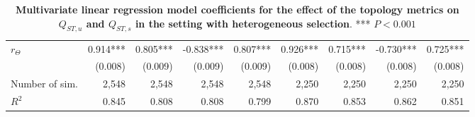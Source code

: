 \begin{table}[ht]
{\begin{tabular}{|l|r|r|r|r|r|r|r|r|}
    $r_\Theta$     &                  0.914*** &                 0.805*** &                -0.838*** &                 0.807***   &  0.926*** &                 0.715*** &                -0.730*** &                 0.725***\\ 
                   &                   (0.008) &                  (0.009) &                  (0.009) &                  (0.009)   &   (0.008) &                  (0.008) &                  (0.008) &                  (0.008)\\ 
    \hline
    Number of sim. &                     2,548 &                    2,548 &                    2,548 &                    2,548   &     2,250 &                    2,250 &                    2,250 &                    2,250\\ 
    $R^2$          &                     0.845 &                    0.808 &                    0.808 &                    0.799   &     0.870 &                    0.853 &                    0.862 &                    0.851\\ 
    \hline 
    \end{tabular}
    }
    \caption{ \textbf{Multivariate linear regression model coefficients for the effect of the topology metrics on $Q_{ST,u}$ and $Q_{ST,s}$ in the setting with heterogeneous selection}. *** $P < 0.001$}
    \label{tableSI:coefficients_set2}
\end{table}


